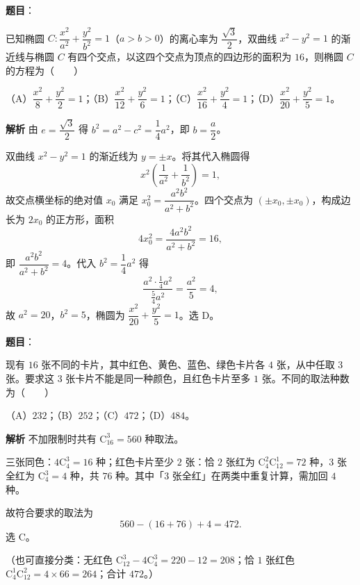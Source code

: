 \begin{answer}

\textbf{题目}：

已知椭圆 $C:\dfrac{x^2}{a^2}+\dfrac{y^2}{b^2}=1$（$a>b>0$）的离心率为 $\dfrac{\sqrt3}2$，双曲线 $x^2-y^2=1$ 的渐近线与椭圆 $C$ 有四个交点，以这四个交点为顶点的四边形的面积为 $16$，则椭圆 $C$ 的方程为\mbox{（　　）}

（A）$\dfrac{x^2}8+\dfrac{y^2}2=1$；（B）$\dfrac{x^2}{12}+\dfrac{y^2}6=1$；（C）$\dfrac{x^2}{16}+\dfrac{y^2}4=1$；（D）$\dfrac{x^2}{20}+\dfrac{y^2}5=1$。

\textbf{解析}
由 $e=\dfrac{\sqrt3}2$ 得 $b^2=a^2-c^2=\dfrac14a^2$，即 $b=\dfrac a2$。

双曲线 $x^2-y^2=1$ 的渐近线为 $y=\pm x$。将其代入椭圆得
\nopagebreak[4]
\[x^2\left(\frac1{a^2}+\frac1{b^2}\right)=1,\]
故交点横坐标的绝对值 $x_0$ 满足 $x_0^2=\dfrac{a^2b^2}{a^2+b^2}$。四个交点为 $(\pm x_0,\pm x_0)$，构成边长为 $2x_0$ 的正方形，面积
\nopagebreak[4]
\[4x_0^2=\frac{4a^2b^2}{a^2+b^2}=16,\]
即 $\dfrac{a^2b^2}{a^2+b^2}=4$。代入 $b^2=\dfrac14a^2$ 得
\nopagebreak[4]
\[\frac{a^2\cdot\frac14a^2}{\frac54a^2}=\frac{a^2}5=4,\]
故 $a^2=20$，$b^2=5$，椭圆为 $\dfrac{x^2}{20}+\dfrac{y^2}5=1$。选 D。


\end{answer}
\begin{answer}

\textbf{题目}：

现有 $16$ 张不同的卡片，其中红色、黄色、蓝色、绿色卡片各 $4$ 张，从中任取 $3$ 张。要求这 $3$ 张卡片不能是同一种颜色，且红色卡片至多 $1$ 张。不同的取法种数为\mbox{（　　）}

（A）$232$；（B）$252$；（C）$472$；（D）$484$。

\textbf{解析}
不加限制时共有 $\mathrm C_{16}^3=560$ 种取法。

三张同色：$4\mathrm C_4^3=16$ 种；红色卡片至少 $2$ 张：恰 $2$ 张红为 $\mathrm C_4^2\mathrm C_{12}^1=72$ 种，$3$ 张全红为 $\mathrm C_4^3=4$ 种，共 $76$ 种。其中「$3$ 张全红」在两类中重复计算，需加回 $4$ 种。

故符合要求的取法为
\nopagebreak[4]
\[560-(16+76)+4=472.\]
选 C。

（也可直接分类：无红色 $\mathrm C_{12}^3-4\mathrm C_4^3=220-12=208$；恰 $1$ 张红色 $\mathrm C_4^1\mathrm C_{12}^2=4\times66=264$；合计 $472$。）


\end{answer}
